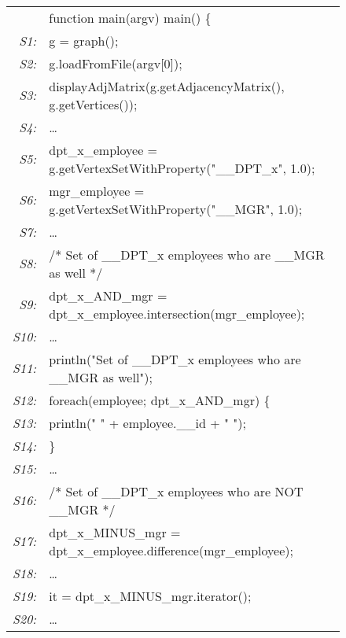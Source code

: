 \documentclass[letterpaper]{sig-alternate} \special{papersize=8.5in,11in}
\begin{document}
\begin{figure}
\begin{center}
      {\small \tt
        \begin{tabular}[b]{rl}
          &function main(argv) main() \{ \\
          {\em \scriptsize S1:}&  \quad  g = graph();\\
          {\em \scriptsize S2:}&  \quad  g.loadFromFile(argv[0]);\\
          {\em \scriptsize S3:}&  \quad  displayAdjMatrix(g.getAdjacencyMatrix(), g.getVertices()); \\
          {\em \scriptsize S4:}&  \quad  \ldots \\
          {\em \scriptsize S5:}&  \quad  dpt\_x\_employee  = g.getVertexSetWithProperty("\_\_DPT\_x", 1.0); \\
          {\em \scriptsize S6:}&  \quad  mgr\_employee    = g.getVertexSetWithProperty("\_\_MGR", 1.0); \\
          {\em \scriptsize S7:}&  \quad  \ldots \\
          {\em \scriptsize S8:}&  \quad /* Set of \_\_DPT\_x employees who are \_\_MGR as well */  \\
          {\em \scriptsize S9:}&  \quad dpt\_x\_AND\_mgr = dpt\_x\_employee.intersection(mgr\_employee); \\
          {\em \scriptsize S10:}&  \quad  \ldots \\
          {\em \scriptsize S11:}&  \quad println("Set of \_\_DPT\_x employees who are \_\_MGR as well");  \\
          {\em \scriptsize S12:}&  \quad foreach(employee; dpt\_x\_AND\_mgr) \{ \\
          {\em \scriptsize S13:}&  \quad \quad println(" " + employee.\_\_id + " "); \\
          {\em \scriptsize S14:}&  \quad \}   \\
          {\em \scriptsize S15:}&  \quad  \ldots \\
          {\em \scriptsize S16:}&  \quad /* Set of \_\_DPT\_x employees who are NOT  \_\_MGR */ \\
          {\em \scriptsize S17:}&  \quad dpt\_x\_MINUS\_mgr = dpt\_x\_employee.difference(mgr\_employee); \\
          {\em \scriptsize S18:}&  \quad    \ldots \\
          {\em \scriptsize S19:}&  \quad it = dpt\_x\_MINUS\_mgr.iterator(); \\
          {\em \scriptsize S20:}&  \quad    \ldots \\

\end{tabular}}
\end{center}
\end{figure}
\end{document}
